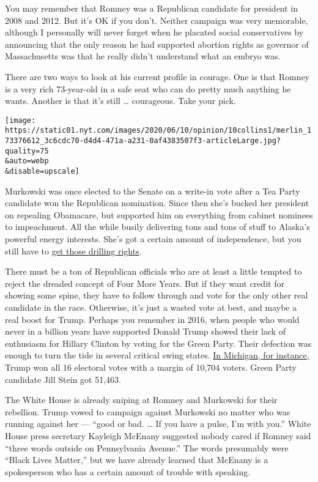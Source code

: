 You may remember that Romney was a Republican candidate for president in
2008 and 2012. But it's OK if you don't. Neither campaign was very
memorable, although I personally will never forget when he placated
social conservatives by announcing that the only reason he had supported
abortion rights as governor of Massachusetts was that he really didn't
understand what an embryo was.

There are two ways to look at his current profile in courage. One is
that Romney is a very rich 73-year-old in a safe seat who can do pretty
much anything he wants. Another is that it's still \ldots{} courageous.
Take your pick.

\texttt{[image: https://static01.nyt.com/images/2020/06/10/opinion/10collins1/merlin\_173376612\_3c6cdc70-d4d4-471a-a231-0af4383507f3-articleLarge.jpg?quality=75\\\&auto=webp\\\&disable=upscale]}

Murkowski was once elected to the Senate on a write-in vote after a Tea
Party candidate won the Republican nomination. Since then she's bucked
her president on repealing Obamacare, but supported him on everything
from cabinet nominees to impeachment. All the while busily delivering
tons and tons of stuff to Alaska's powerful energy interests. She's got
a certain amount of independence, but you still have to
\href{https://www.washingtonpost.com/news/powerpost/paloma/the-energy-202/2020/06/08/the-energy-202-lisa-murkowski-s-wins-for-alaska-help-protect-her-against-trump-attacks/5edd2548602ff12947e86583/}{get
those drilling rights}.

There must be a ton of Republican officials who are at least a little
tempted to reject the dreaded concept of Four More Years. But if they
want credit for showing some spine, they have to follow through and vote
for the only other real candidate in the race. Otherwise, it's just a
wasted vote at best, and maybe a real boost for Trump. Perhaps you
remember in 2016, when people who would never in a billion years have
supported Donald Trump showed their lack of enthusiasm for Hillary
Clinton by voting for the Green Party. Their defection was enough to
turn the tide in several critical swing states.
\href{https://www.nytimes.com/2018/11/09/opinion/third-party-midterms.html}{In
Michigan, for instance,} Trump won all 16 electoral votes with a margin
of 10,704 voters. Green Party candidate Jill Stein got 51,463.

The White House is already sniping at Romney and Murkowski for their
rebellion. Trump vowed to campaign against Murkowski no matter who was
running against her --- ``good or bad. \ldots{} If you have a pulse, I'm
with you.'' White House press secretary Kayleigh McEnany suggested
nobody cared if Romney said ``three words outside on Pennsylvania
Avenue.'' The words presumably were ``Black Lives Matter,'' but we have
already learned that McEnany is a spokesperson who has a certain amount
of trouble with speaking.

